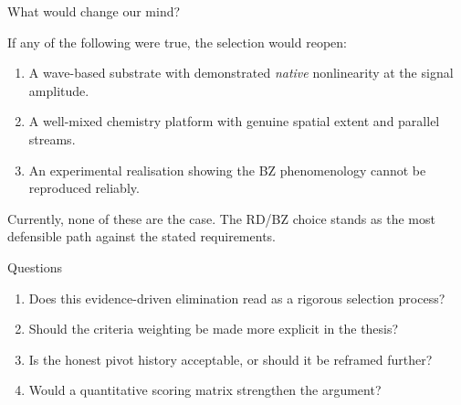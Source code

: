 \documentclass[aspectratio=169,11pt]{beamer}
\begin{document}
\begin{frame}{What would change our mind?}

If any of the following were true, the selection would reopen:

\vspace{0.3cm}
\begin{enumerate}
    \item A wave-based substrate with demonstrated \emph{native} nonlinearity at the signal amplitude.
    \item A well-mixed chemistry platform with genuine spatial extent and parallel streams.
    \item An experimental realisation showing the BZ phenomenology cannot be reproduced reliably.
\end{enumerate}

\vspace{0.3cm}
Currently, none of these are the case. The RD/BZ choice stands as the most defensible path against the stated requirements.

\end{frame}

\begin{frame}{Questions}

\begin{enumerate}
    \item Does this evidence-driven elimination read as a rigorous selection process?
    \item Should the criteria weighting be made more explicit in the thesis?
    \item Is the honest pivot history acceptable, or should it be reframed further?
    \item Would a quantitative scoring matrix strengthen the argument?
\end{enumerate}

\end{frame}
\end{document}
